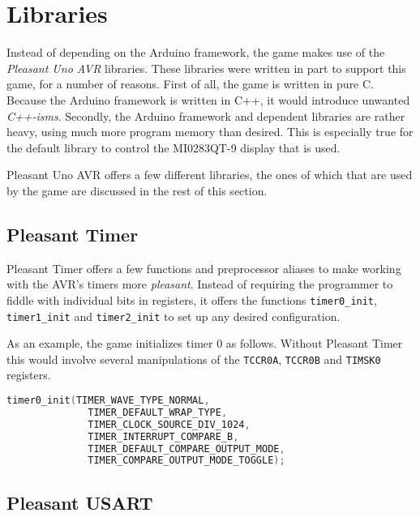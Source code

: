 \section{Libraries}
\label{sec:libraries}

Instead of depending on the Arduino framework, the game makes use of the
\emph{Pleasant Uno AVR}\cite{pleasant-uno-avr} libraries. These libraries were
written in part to support this game, for a number of reasons. First of all,
the game is written in pure C. Because the Arduino framework is written in C++,
it would introduce unwanted \emph{C++-isms}. Secondly, the Arduino framework
and dependent libraries are rather heavy, using much more program memory than
desired. This is especially true for the default library to control the
MI0283QT-9 display that is used.

Pleasant Uno AVR offers a few different libraries, the ones of which that are
used by the game are discussed in the rest of this section.

\subsection{Pleasant Timer}
\label{sec:libraries/pleasant-timer}

Pleasant Timer offers a few functions and preprocessor aliases to make working
with the AVR's timers more \emph{pleasant}. Instead of requiring the programmer
to fiddle with individual bits in registers, it offers the functions
\texttt{timer0\_init}, \texttt{timer1\_init} and \texttt{timer2\_init} to set
up any desired configuration.

As an example, the game initializes timer 0 as follows. Without Pleasant Timer
this would involve several manipulations of the \texttt{TCCR0A},
\texttt{TCCR0B} and \texttt{TIMSK0} registers.

\begin{lstlisting}[language=C,frame=single]
  timer0_init(TIMER_WAVE_TYPE_NORMAL,
              TIMER_DEFAULT_WRAP_TYPE,
              TIMER_CLOCK_SOURCE_DIV_1024,
              TIMER_INTERRUPT_COMPARE_B,
              TIMER_DEFAULT_COMPARE_OUTPUT_MODE,
              TIMER_COMPARE_OUTPUT_MODE_TOGGLE);
\end{lstlisting}

\subsection{Pleasant USART}
\label{sec:libraries/pleasant-usart}

